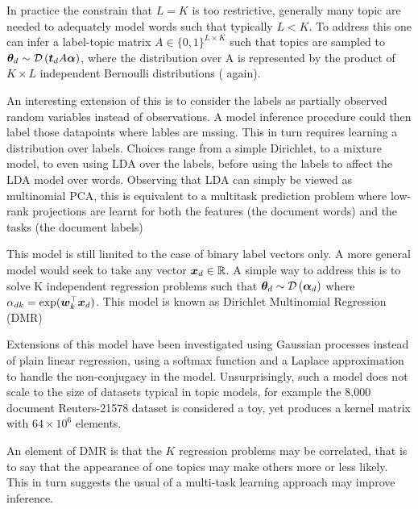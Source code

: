 In practice the constrain that $L = K$ is too restrictive, generally many topic are needed to adequately model words such that typically $L < K$. To address this one can infer a label-topic matrix $A \in \{0,1\}^{L \times K}$ such that topics are sampled to ${ \bm \theta_d } \sim \mathcal{D} \left( {\bm t_d A \bm \alpha} \right)$, where the distribution over A is represented by the product of $K \times L$ independent Bernoulli distributions (\cite{Ramage2009} again).

An interesting extension of this is to consider the labels as partially observed random variables instead of observations. A model inference procedure could then label those datapoints where lables are mssing. This in turn requires learning a distribution over labels. Choices range from a simple Dirichlet, to a mixture model, to even using LDA over the labels, before using the labels to affect the LDA model over words\cite{Rubin2011}. Observing that LDA can simply be viewed as multinomial PCA, this is equivalent to a multitask prediction problem where low-rank projections are learnt for both the features (the document words) and the tasks (the document labels)

This model is still limited to the case of binary label vectors only. A more general model would seek to take any vector ${ \bm x_d } \in \mathbb{R}$. A simple way to address this is to solve K independent regression problems such that ${ \bm \theta_d } \sim \mathcal{D} \left( {\bm \alpha_{d}} \right)$ where $\alpha_{dk} = \exp(\bm w_k^\top\bm x_d)$\cite{Mimno2008}. This model is known as Dirichlet Multinomial Regression (DMR)

Extensions of this model have been investigated using Gaussian processes instead of plain linear regression, using a softmax function\cite{Hennig2012} and a Laplace approximation\cite{WilliamsBarber1998} to handle the non-conjugacy in the model. Unsurprisingly, such a model does not scale to the size of datasets typical in topic models, for example the 8,000 document Reuters-21578 dataset is considered a toy, yet produces a kernel matrix with $64 \times 10^6$ elements.

An element of DMR is that the $K$ regression problems may be correlated, that is to say that the appearance of one topics may make others more or less likely. This in turn suggests the usual of a multi-task learning approach may improve inference.


